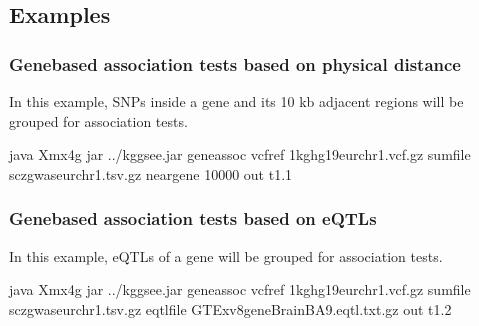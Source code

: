 \documentclass[letterpaper,10pt,english,openany,oneside]{sphinxmanual}
\begin{document}
\newpage
\subsection{Examples}
\label{\detokenize{detailed_document:examples}}

\subsubsection{Gene\sphinxhyphen{}based association tests based on physical distance}
\label{\detokenize{detailed_document:gene-based-association-tests-based-on-physical-distance}}
\sphinxAtStartPar
In this example, SNPs inside a gene and its 10 kb adjacent regions will be grouped for association tests.

\begin{sphinxVerbatim}[commandchars=\\\{\}]
java \PYGZhy{}Xmx4g \PYGZhy{}jar ../kggsee.jar 
\PYGZhy{}\PYGZhy{}gene\PYGZhy{}assoc 
\PYGZhy{}\PYGZhy{}vcf\PYGZhy{}ref 1kg\PYGZus{}hg19\PYGZus{}eur\PYGZus{}chr1.vcf.gz 
\PYGZhy{}\PYGZhy{}sum\PYGZhy{}file scz\PYGZus{}gwas\PYGZus{}eur\PYGZus{}chr1.tsv.gz 
\PYGZhy{}\PYGZhy{}neargene 10000 
\PYGZhy{}\PYGZhy{}out t1.1
\end{sphinxVerbatim}


\subsubsection{Gene\sphinxhyphen{}based association tests based on eQTLs}
\label{\detokenize{detailed_document:gene-based-association-tests-based-on-eqtls}}
\sphinxAtStartPar
In this example, eQTLs of a gene will be grouped for association tests.

\begin{sphinxVerbatim}[commandchars=\\\{\}]
java \PYGZhy{}Xmx4g \PYGZhy{}jar ../kggsee.jar 
  \PYGZhy{}\PYGZhy{}gene\PYGZhy{}assoc 
  \PYGZhy{}\PYGZhy{}vcf\PYGZhy{}ref 1kg\PYGZus{}hg19\PYGZus{}eur\PYGZus{}chr1.vcf.gz 
  \PYGZhy{}\PYGZhy{}sum\PYGZhy{}file scz\PYGZus{}gwas\PYGZus{}eur\PYGZus{}chr1.tsv.gz 
  \PYGZhy{}\PYGZhy{}eqtl\PYGZhy{}file GTEx\PYGZus{}v8\PYGZus{}gene\PYGZus{}BrainBA9.eqtl.txt.gz 
  \PYGZhy{}\PYGZhy{}out t1.2
\end{sphinxVerbatim}
\end{document}
